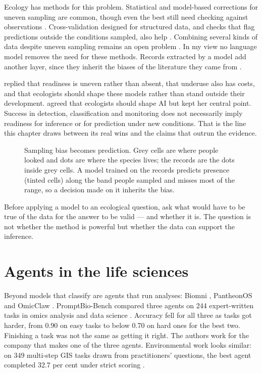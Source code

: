 Ecology has methods for this problem. Statistical and model-based corrections
for uneven sampling are common, though even the best still need checking
against observations \parencite{hughes2021sampling}. Cross-validation designed
for structured data, and checks that flag predictions outside the conditions
sampled, also help \parencite{pichler2023review}. Combining several kinds of
data despite uneven sampling remains an open problem
\parencite{tuia2022perspectives}. In my view no language model removes the need
for these methods. Records extracted by a model add another layer, since they
inherit the biases of the literature they came from \parencite{keck2026interactions}.

\textcite{roff2026shape} replied that readiness is uneven rather than absent,
that underuse also has costs, and that ecologists should shape these models
rather than stand outside their development. \textcite{mishra2026reply} agreed
that ecologists should shape AI but kept her central point. Success in
detection, classification and monitoring does not necessarily imply readiness
for inference or for prediction under new conditions. That is the line this
chapter draws between its real wins and the claims that outrun the evidence.

\begin{figure}[htbp]
\centering
{}
\caption{Sampling bias becomes prediction. Grey cells are where people looked
and dots are where the species lives; the records are the dots inside grey
cells. A model trained on the records predicts presence (tinted cells) along
the band people sampled and misses most of the range, so a decision made on it
inherits the bias.}
\label{fig:samplingbias}
\end{figure}

\begin{keypoint}
Before applying a model to an ecological question, ask what would have to be
true of the data for the answer to be valid --- and whether it is. The question
is not whether the method is powerful but whether the data can support the
inference.
\end{keypoint}

\section{Agents in the life sciences}

Beyond models that classify are agents that run analyses: Biomni
\parencite{huang2025biomni}, PantheonOS \parencite{xu2026pantheonos} and
OmicClaw \parencite{zeng2026omicclaw}. PromptBio-Bench compared three agents
on 244 expert-written tasks in omics analysis and data science
\parencite{guo2026promptbio}. Accuracy fell for all three as tasks got harder,
from 0.90 on easy tasks to below 0.70 on hard ones for the best two. Finishing a
task was not the same as getting it right. The authors work for the company
that makes one of the three agents. Environmental
work looks similar: on 349 multi-step GIS tasks drawn from practitioners'
questions, the best agent completed 32.7 per cent under strict scoring
\parencite{pothuri2026gisagentbench}.

